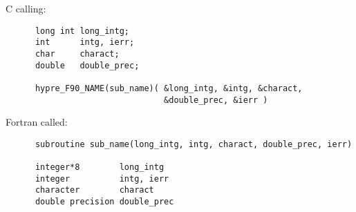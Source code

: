 \vspace{0.1in}

  C calling:
\begin{verbatim}
      long int long_intg;
      int      intg, ierr;
      char     charact;
      double   double_prec;

      hypre_F90_NAME(sub_name)( &long_intg, &intg, &charact,
                                &double_prec, &ierr )
\end{verbatim}

  Fortran called:
\begin{verbatim}
      subroutine sub_name(long_intg, intg, charact, double_prec, ierr)

      integer*8        long_intg
      integer          intg, ierr
      character        charact
      double precision double_prec
\end{verbatim}

